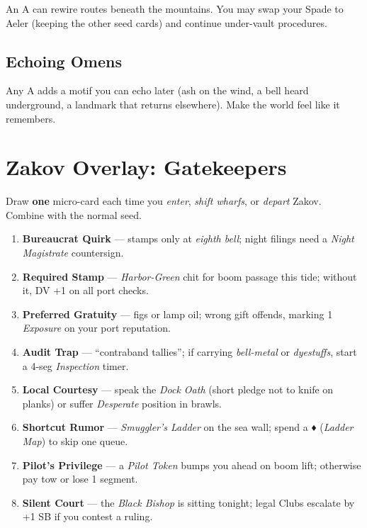 \documentclass[12pt,oneside]{book}
\renewcommand{\diamondsuit}{♦}
\begin{document}
An A can rewire routes beneath the mountains. You may swap your Spade to Aeler (keeping the other seed cards) and continue under-vault procedures.

\subsection{Echoing Omens}

Any A adds a motif you can echo later (ash on the wind, a bell heard underground, a landmark that returns elsewhere). Make the world feel like it remembers.

\section{Zakov Overlay: Gatekeepers}

Draw \textbf{one} micro-card each time you \emph{enter}, \emph{shift wharfs}, or \emph{depart} Zakov. Combine with the normal seed.

\begin{tcolorbox}[enhanced,breakable,sharp corners,boxrule=.6pt,title={\textbf{Zakov Gatekeepers Micro-Cards (draw 1)}}]
\begin{enumerate}[label=\arabic*.]
  \item \textbf{Bureaucrat Quirk} --- stamps only at \emph{eighth bell}; night filings need a \emph{Night Magistrate} countersign.
  \item \textbf{Required Stamp} --- \emph{Harbor-Green} chit for boom passage this tide; without it, DV +1 on all port checks.
  \item \textbf{Preferred Gratuity} --- figs or lamp oil; wrong gift offends, marking 1 \emph{Exposure} on your port reputation.
  \item \textbf{Audit Trap} --- ``contraband tallies''; if carrying \emph{bell-metal} or \emph{dyestuffs}, start a 4-seg \emph{Inspection} timer.
  \item \textbf{Local Courtesy} --- speak the \emph{Dock Oath} (short pledge not to knife on planks) or suffer \emph{Desperate} position in brawls.
  \item \textbf{Shortcut Rumor} --- \emph{Smuggler's Ladder} on the sea wall; spend a \diamondsuit{} (\emph{Ladder Map}) to skip one queue.
  \item \textbf{Pilot's Privilege} --- a \emph{Pilot Token} bumps you ahead on boom lift; otherwise pay tow or lose 1 segment.
  \item \textbf{Silent Court} --- the \emph{Black Bishop} is sitting tonight; legal Clubs escalate by +1 SB if you contest a ruling.
\end{enumerate}
\end{tcolorbox}
\end{document}
